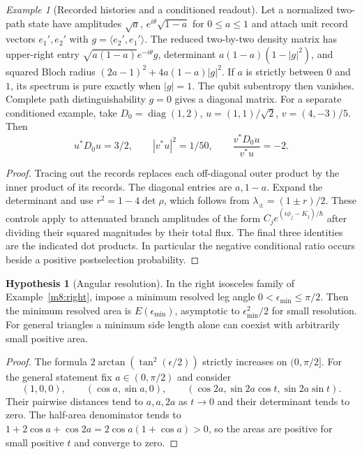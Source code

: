 \documentclass[11pt,reqno]{amsart}
\theoremstyle{definition}
\newtheorem{hypothesis}[theorem]{Hypothesis}
\theoremstyle{remark}
\newtheorem{example}[theorem]{Example}
\numberwithin{equation}{section}
\begin{document}
\begin{example}[Recorded histories and a conditioned readout]\label{m8:histories}
Let a normalized two-path state have amplitudes
$\sqrt a$, $e^{i\theta}\sqrt{1-a}$ for $0\le a\le1$ and attach
unit record vectors $e_1',e_2'$ with $g=\langle e_2',e_1'\rangle$.
The reduced two-by-two density matrix has upper-right entry
$\sqrt{a(1-a)}e^{-i\theta}g$, determinant $a(1-a)(1-|g|^2)$,
and squared Bloch radius $(2a-1)^2+4a(1-a)|g|^2$.
If $a$ is strictly between $0$ and $1$, its spectrum is pure
exactly when $|g|=1$. The qubit subentropy then vanishes.
Complete path distinguishability $g=0$ gives a diagonal
matrix. For a separate conditioned example, take
$D_0=\operatorname{diag}(1,2)$, $u=(1,1)/\sqrt2$,
$v=(4,-3)/5$. Then
\[
 u^*D_0u=3/2,\qquad |v^*u|^2=1/50,\qquad
 \frac{v^*D_0u}{v^*u}=-2 .
\]
\end{example}
\begin{proof}
Tracing out the records replaces each off-diagonal outer
product by the inner product of its records. The diagonal entries
are $a,1-a$. Expand the determinant and use $r^2=1-4\det\rho$,
which follows from $\lambda_\pm=(1\pm r)/2$. These controls apply
to attenuated branch amplitudes of the form $C_j e^{(i\phi_j-K_j)/\hbar}$
after dividing their squared magnitudes by their total flux.
The final three identities are the indicated dot products.
In particular the negative conditional ratio occurs beside a
positive postselection probability.
\end{proof}


\begin{hypothesis}[Angular resolution]\label{m8:resolution}
In the right isosceles family of Example~\ref{m8:right}, impose a
minimum resolved leg angle $0<\epsilon_{\min}\le\pi/2$.
Then the minimum resolved area is $E(\epsilon_{\min})$,
asymptotic to $\epsilon_{\min}^2/2$ for small resolution.
For general triangles a minimum side length alone can coexist
with arbitrarily small positive area.
\end{hypothesis}
\begin{proof}
The formula $2\arctan(\tan^2(\epsilon/2))$ strictly increases
on $(0,\pi/2]$. For the general statement fix $a\in(0,\pi/2)$
and consider
\[
 (1,0,0),\qquad (\cos a,\sin a,0),\qquad
 (\cos2a,\sin2a\cos t,\sin2a\sin t).
\]
Their pairwise distances tend to $a,a,2a$ as $t\to0$ and their
determinant tends to zero. The half-area denominator tends to
$1+2\cos a+\cos2a=2\cos a(1+\cos a)>0$, so the areas are positive
for small positive $t$ and converge to zero.
\end{proof}
\end{document}
